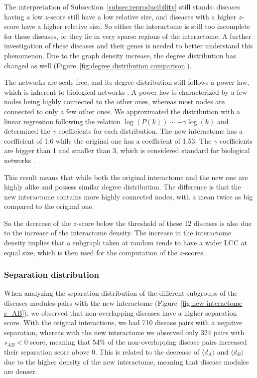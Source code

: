 \documentclass[letterpaper]{article}
\begin{document}
	\pagebreak

	The interpretation of Subsection~\ref{subsec:reproducibility} still stands: diseases having
	a low $z$-score still have a low relative size, and diseases with a higher $z$-score have a higher
	relative size. So either the interactome is still too incomplete for these diseases, or they lie in
	very sparse regions of the interactome. A further investigation of these diseases and their genes
	is needed to better understand this phenomenon. Due to the graph density increase, the degree
	distribution has changed as well (Figure~\ref{fig:degree distribution comparison}).

	The networks are scale-free, and its degree distribution still follows a power law, which is inherent to
	biological networks \cite{vidal2011interactome}. A power law is characterized by a few nodes being highly
	connected to the other ones, whereas most nodes are connected to only a few other ones. We approximated
	the distribution with a linear regression following the relation $\log(P(k)) \sim -\gamma\log(k)$ and
	determined the $\gamma$ coefficients for each distribution. The new interactome has a coefficient of
	1.6 while the original one has a coefficient of 1.53. The $\gamma$ coefficients are bigger than 1 and
	smaller than 3, which is considered standard for biological networks
	\citep{UnderstandingTheCellFunctionalOrganization,vidal2011interactome}.

	This result means that while both the original interactome and the new one are highly alike and possess
	similar degree distribution. The difference is that the new interactome contains more highly connected
	nodes, with a mean twice as big compared to the original one.

	So the decrease of the $z$-score below the threshold of these 12 diseases is also due to the increase of
	the interactome density. The increase in the interactome density implies that a subgraph taken at random
	tends to have a wider LCC at equal size, which is then used for the computation of the $z$-scores.

\subsubsection{Separation distribution}
	When analyzing the separation distribution of the different subgroups of the diseases modules pairs with
	the new interactome (Figure~\ref{fig:new interactome s_AB}), we observed that non-overlapping diseases have
	a higher separation score. With the original interactions, we had 710 disease pairs with a negative separation,
	whereas with the new interactome we observed only 324 pairs with $s_{AB} < 0$ score, meaning that
	$54\%$ of the non-overlapping disease pairs increased their separation score above 0. This is related to the
	decrease of $\langle d_A \rangle$ and $\langle d_B \rangle$ due to the higher density of the new interactome,
	meaning that disease modules are denser.
\end{document}
